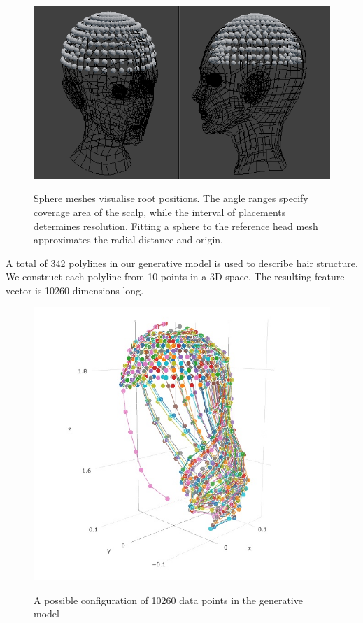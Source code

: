 \documentclass[ %
author={Dillon Keith Diep},
supervisor={Dr. Carl Henrik Ek},
degree={MEng},
title={ART-CG Hair:},
subtitle={Assisted Real-time Content Generation of Stylised Virtual Hair},
type={Research},
year={2017} ]{dissertation}
\begin{document}
\begin{figure}[!h]
	\centering
	\caption{Sphere meshes visualise root positions. The angle ranges specify coverage area of the scalp, while the interval of placements determines resolution. Fitting a sphere to the reference head mesh approximates the radial distance and origin.}
	\includegraphics[scale=0.5]{images/spherePoints}\\
\end{figure}

A total of 342 polylines in our generative model is used to describe hair structure. We construct each polyline from 10 points in a 3D space. The resulting feature vector is 10260 dimensions long.

\begin{figure}[!h]
	\centering
	\includegraphics[scale=3]{images/generativeModel}\\
	\caption{A possible configuration of 10260 data points in the generative model}
\end{figure}
\end{document}
